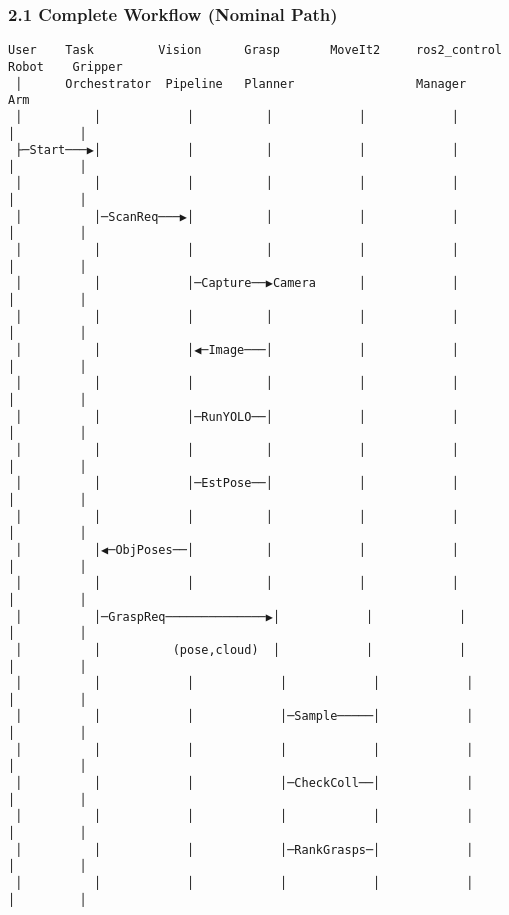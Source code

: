 \documentclass[
]{article}
\begin{document}
\hypertarget{complete-workflow-nominal-path}{%
\subsubsection{2.1 Complete Workflow (Nominal
Path)}\label{complete-workflow-nominal-path}}

\begin{verbatim}
User    Task         Vision      Grasp       MoveIt2     ros2_control   Robot    Gripper
 │      Orchestrator  Pipeline   Planner                 Manager        Arm
 │          │            │          │            │            │           │         │
 ├─Start───▶│            │          │            │            │           │         │
 │          │            │          │            │            │           │         │
 │          │─ScanReq───▶│          │            │            │           │         │
 │          │            │          │            │            │           │         │
 │          │            │─Capture──▶Camera      │            │           │         │
 │          │            │          │            │            │           │         │
 │          │            │◀─Image───│            │            │           │         │
 │          │            │          │            │            │           │         │
 │          │            │─RunYOLO──│            │            │           │         │
 │          │            │          │            │            │           │         │
 │          │            │─EstPose──│            │            │           │         │
 │          │            │          │            │            │           │         │
 │          │◀─ObjPoses──│          │            │            │           │         │
 │          │            │          │            │            │           │         │
 │          │─GraspReq──────────────▶│            │            │           │         │
 │          │          (pose,cloud)  │            │            │           │         │
 │          │            │            │            │            │           │         │
 │          │            │            │─Sample─────│            │           │         │
 │          │            │            │            │            │           │         │
 │          │            │            │─CheckColl──│            │           │         │
 │          │            │            │            │            │           │         │
 │          │            │            │─RankGrasps─│            │           │         │
 │          │            │            │            │            │           │         │

\end{verbatim}
\end{document}
